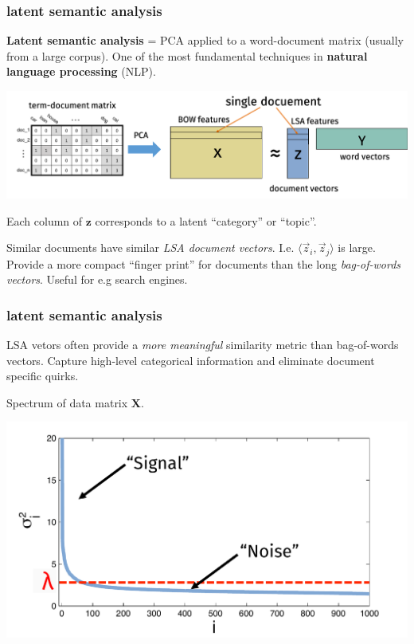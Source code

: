 \documentclass[handout,compress]{beamer}
\newcommand{\bv}[1]{\mathbf{#1}}
\begin{document}
\begin{frame}
	\frametitle{latent semantic analysis}
	\textbf{Latent semantic analysis} = PCA applied to a word-document matrix (usually from a large corpus). One of the most fundamental techniques in \textbf{natural language processing} (NLP). 
	\begin{center}
		\includegraphics[width=\textwidth]{mylsa.png}
	\end{center}
	Each column of $\bv{z}$ corresponds to a latent ``category'' or ``topic''. 
	
	Similar documents have similar \emph{LSA document vectors}. I.e. $\langle \vec{z}_i, \vec{z}_j\rangle$ is large. Provide a more compact ``finger print'' for documents than the long \emph{bag-of-words vectors}. Useful for e.g search engines.  
\end{frame}

\begin{frame}
	\frametitle{latent semantic analysis}
	LSA vetors often provide a \emph{more meaningful} similarity metric than bag-of-words vectors. Capture high-level categorical information and eliminate document specific quirks. 
	\begin{center}
		Spectrum of data matrix $\bv{X}$. 
		
		\includegraphics[width=.7\textwidth]{spectrumAnnotate.pdf}
	\end{center}
\end{frame}
\end{document}
